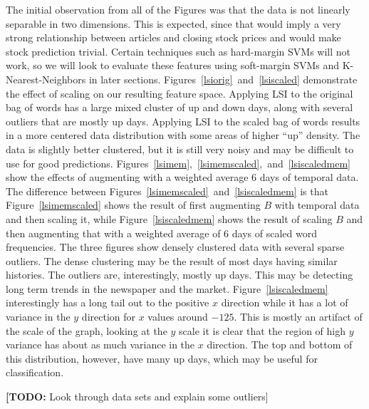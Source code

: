 \documentclass[10pt, twocolumn]{article}
\def\TODO#1{\noindent\textbf{[TODO:} #1]}
\begin{document}
The initial observation from all of the Figures was that the data is not linearly separable in two dimensions. This is expected, since that would imply a very strong relationship between articles and closing stock prices and would make stock prediction trivial. Certain techniques such as hard-margin SVMs will not work, so we will look to evaluate these features using soft-margin SVMs and K-Nearest-Neighbors in later sections. Figures~\ref{lsiorig}~and~\ref{lsiscaled} demonstrate the effect of scaling on our resulting feature space. Applying LSI to the original bag of words has a large mixed cluster of up and down days, along with several outliers that are mostly up days. Applying LSI to the scaled bag of words results in a more centered data distribution with some areas of higher ``up'' density. The data is slightly better clustered, but it is still very noisy and may be difficult to use for good predictions. Figures~\ref{lsimem},~\ref{lsimemscaled},~and~\ref{lsiscaledmem} show the effects of augmenting with a weighted average 6 days of temporal data. The difference between Figures~\ref{lsimemscaled}~and~\ref{lsiscaledmem} is that Figure~\ref{lsimemscaled} shows the result of first augmenting $B$ with temporal data and then scaling it, while Figure~\ref{lsiscaledmem} shows the result of scaling $B$ and then augmenting that with a weighted average of 6 days of scaled word frequencies. The three figures show densely clustered data with several sparse outliers. The dense clustering may be the result of most days having similar histories. The outliers are, interestingly, mostly up days. This may be detecting long term trends in the newspaper and the market. Figure~\ref{lsiscaledmem} interestingly has a long tail out to the positive $x$ direction while it has a lot of variance in the $y$ direction for $x$ values around $-125$. This is mostly an artifact of the scale of the graph, looking at the $y$ scale it is clear that the region of high $y$ variance has about as much variance in the $x$ direction. The top and bottom of this distribution, however, have many up days, which may be useful for classification.

\TODO{Look through data sets and explain some outliers}
\end{document}

